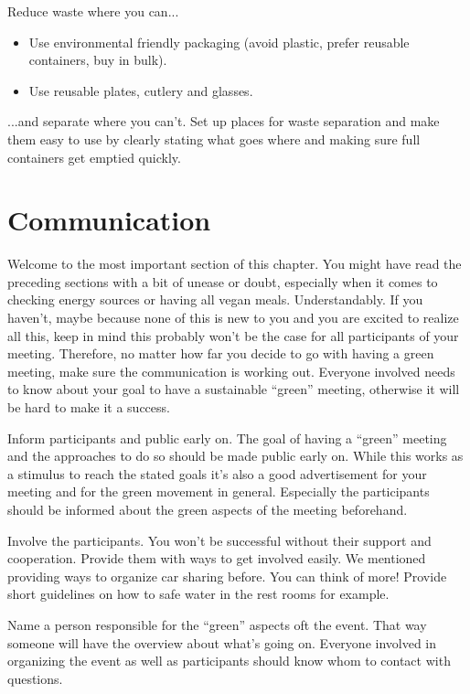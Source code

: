 \begin{suggest}{Reduce waste where you can...}
	\vspace{-2\topsep}
	\begin{itemize}
	\item Use environmental friendly packaging (avoid plastic, prefer reusable containers, buy in bulk).
	\item Use reusable plates, cutlery and glasses.
	\end{itemize}
\end{suggest}

\begin{suggest}{...and separate where you can't.}
	Set up places for waste separation and make them easy to use by clearly stating what goes where and making sure full containers get emptied quickly.
\end{suggest}

\section{Communication}
Welcome to the most important section of this chapter. You might have read the preceding sections with a bit of unease or doubt, especially when it comes to checking energy sources or having all vegan meals. Understandably. If you haven't, maybe because none of this is new to you and you are excited to realize all this, keep in mind this probably won't be the case for all participants of your meeting. Therefore, no matter how far you decide to go with having a green meeting, make sure the communication is working out. Everyone involved needs to know about your goal to have a sustainable ``green'' meeting, otherwise it will be hard to make it a success.

\begin{suggest}{Inform participants and public early on.}
	The goal of having a ``green'' meeting and the approaches to do so should be made public early on. While this works as a stimulus to reach the stated goals it's also a good advertisement for your meeting and for the green movement in general. Especially the participants should be informed about the green aspects of the meeting beforehand.
\end{suggest}

\begin{suggest}{Involve the participants.}
	You won't be successful without their support and cooperation. Provide them with ways to get involved easily. We mentioned providing ways to organize car sharing before. You can think of more! Provide short guidelines on how to safe water in the rest rooms for example.
\end{suggest}

\begin{suggest}{Name a person responsible for the ``green'' aspects oft the event.}
	That way someone will have the overview about what's going on. Everyone involved in organizing the event as well as participants should know whom to contact with questions.
\end{suggest}